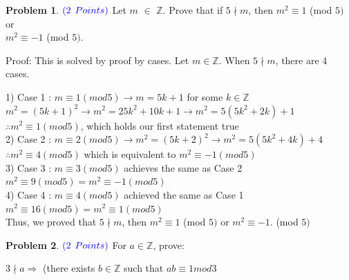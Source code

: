 \documentclass[letterpaper, 12pt]{article}
\theoremstyle{definition}
\newtheorem{pb}{Problem} %
\begin{document}
\begin{spacing}{1.33}
\vspace{1cm}
\begin{pb} 
    $\color{blue}{(2}$ $\color{blue}{Points)}$ Let $m$ $\in$ $\mathbb{Z}$. Prove that if $5 \nmid m$, then $m^2 \equiv 1$ (mod $5)$ or \\ 
    $m^2 \equiv -1$ (mod $5)$.

    Proof: This is solved by proof by cases. Let $m \in \mathbb{Z}$. When $5\nmid m$, there are 4 cases.

    \begin{center}
        1) Case 1 : $m\equiv1(mod5) \longrightarrow m =5k+1$ for some $k \in \mathbb{Z}$\\
        $m^2 = (5k+1)^2 \longrightarrow m^2 = 25k^2 + 10k +1 \longrightarrow m^2 = 5(5k^2+2k)+1$\\
        $\therefore m^2 \equiv 1(mod5)$, which holds our first statement true\\
        \vspace{5mm}
        2) Case 2 : $m\equiv2(mod5) \longrightarrow m^2 = (5k+2)^2 \longrightarrow m^2 = 5(5k^2 + 4k) + 4$\\
        $\therefore m^2 \equiv 4(mod5)$ which is equivalent to $m^2 \equiv -1(mod5)$\\
        \vspace{5mm}
        3) Case 3 : $m\equiv3(mod5)$ achieves the same as Case 2\\ $m^2 \equiv 9(mod5) = m^2 \equiv -1(mod5)$\\
        \vspace{5mm}
        4) Case 4 : $m\equiv4(mod5)$ achieved the same as Case 1\\ $m^2 \equiv 16(mod5) = m^2 \equiv 1(mod5)$\\
        \vspace{5mm}
        Thus, we proved that $5 \nmid m$, then $m^2 \equiv 1$ (mod $5)$ or $m^2 \equiv -1$. (mod $5)$
    \end{center}

\end{pb}






\vspace{1cm} %
\begin{pb}
    $\color{blue}{(2}$ $\color{blue}{Points)}$ For $a \in \mathbb{Z}$, prove:
    \begin{center}
    $3 \nmid a \Longrightarrow$ (there exists $b \in \mathbb{Z}$ such that $ab \equiv 1 mod 3$
    \end{center}


\end{pb}
\end{spacing}
\end{document}
